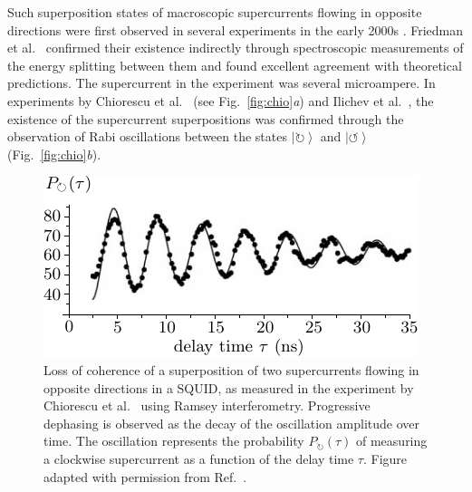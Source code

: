 \documentclass[3p,sort&compress,12pt]{elsarticle}
\newcommand{\ket}[1]{\left\vert{#1}\right\rangle}
\begin{document}
Such superposition states of macroscopic supercurrents flowing in opposite directions were first observed in several experiments in the early 2000s \cite{Friedman:2000:rr,Wal:2000:om,Chiorescu:2003:ta,Ilichev:2003:tv}. Friedman et al.\ \cite{Friedman:2000:rr} confirmed their existence indirectly through spectroscopic measurements of the energy splitting between them and found excellent agreement with theoretical predictions. The supercurrent in the experiment was several microampere. In experiments by Chiorescu et al.\ \cite{Chiorescu:2003:ta} (see Fig.~\ref{fig:chio}\emph{a}) and Ilichev et al.\ \cite{Ilichev:2003:tv}, the existence of the supercurrent superpositions was confirmed through the observation of Rabi oscillations between the states $\ket{\circlearrowright}$ and $\ket{\circlearrowleft}$ (Fig.~\ref{fig:chio}\emph{b}). 


\begin{figure}
\centering
\includegraphics[scale=0.9]{chiorescu2.pdf}
\caption{Loss of coherence of a superposition of two supercurrents flowing in opposite directions in a SQUID, as measured in the experiment by Chiorescu et al.\
\cite{Chiorescu:2003:ta} using Ramsey interferometry. Progressive dephasing is observed as the decay of the oscillation amplitude over time. The oscillation represents the probability $P_{\circlearrowright}(\tau)$ of measuring a clockwise supercurrent as a function of the delay time $\tau$.  Figure adapted with permission from Ref.~\cite{Chiorescu:2003:ta}.}
\label{fig:chiorescu2}
\end{figure}
\end{document}
